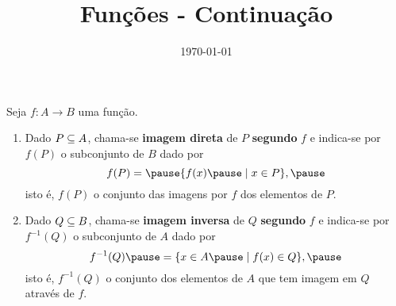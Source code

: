 \documentclass{beamer}
\title{Fun\c{c}\~oes - Continua\c{c}\~ao}
\author[\autor]{\autor}
\institute[\instituto]{\instituto}
\date{\today}
\begin{document}
    \begin{frame}
        \maketitle
    \end{frame}

    
    \begin{frame}
        \begin{definicao}
            Seja $f : A \to B$ \pause uma fun{\c c}{\~a}o.\pause
            \begin{enumerate}[label={\roman*})]
                \item Dado $P \subseteq A$, \pause chama-se \textbf{imagem direta} \pause de $P$ \pause \textbf{segundo} $f$ \pause e indica-se por $f(P)$ \pause o subconjunto de $B$ \pause dado por\pause
                \[
                    f(P) = \pause \{f(x) \pause \mid x \in P\},\pause
                \]
                isto {\'e}, \pause $f(P)$  o conjunto das imagens por $f$ \pause dos elementos de $P$.\pause
                
                \vspace{.5cm}

                \item Dado $Q \subseteq B$, \pause chama-se \textbf{imagem inversa} \pause de $Q$ \textbf{segundo} $f$ \pause e indica-se por \pause $f^{-1}(Q)$ \pause o subconjunto de $A$ \pause dado por\pause
                \[
                    f^{-1}(Q) \pause = \{x \in A \pause \mid f(x) \in Q\},\pause
                \]
                isto {\'e}, \pause $f^{-1}(Q)$  o conjunto dos elementos de $A$ \pause que tem imagem em $Q$ \pause atrav{\'e}s de $f$.\pause
            \end{enumerate}
        \end{definicao}
    \end{frame}

    \begin{frame}
        \vspace{5cm}
    \end{frame}

    \begin{frame}
        \vspace{5cm}
    \end{frame}
\end{document}
